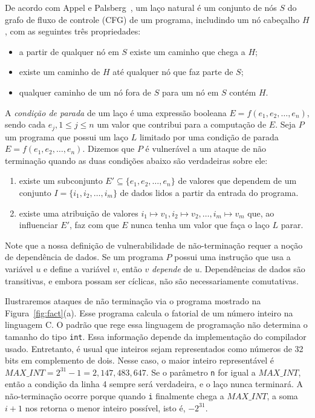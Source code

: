 \documentclass{llncs}
\begin{document}
De acordo com Appel e Palsberg~\cite[p.376]{Appel02}, um laço natural é um
conjunto de nós $S$ do grafo de fluxo de controle (CFG) de um programa,
includindo um nó cabeçalho $H$, com as seguintes três propriedades:
%
\begin{itemize}
\item a partir de qualquer nó em $S$ existe um caminho que chega a $H$;
\item existe um caminho de $H$ até qualquer nó que faz parte de $S$;
\item qualquer caminho de um nó fora de $S$ para um nó em $S$
contém $H$.
\end{itemize}
%
A {\em condição de parada} de um laço é uma expressão booleana
$E = f(e_1, e_2, \ldots, e_n)$, sendo cada $e_j, 1 \leq j \leq n$ um valor que
contribui para a computação de $E$.
Seja $P$ um programa que possui um laço $L$ limitado por uma condição
de parada $E = f(e_1, e_2, \ldots, e_n)$.
Dizemos que $P$ é vulnerável a um ataque de não
terminação quando as duas condições abaixo são verdadeiras sobre ele:
\begin{enumerate}
\item existe um subconjunto $E' \subseteq \{e_1, e_2, \ldots, e_n\}$ de
valores que dependem de um conjunto $I = \{i_1, i_2, \ldots, i_m\}$ de
dados lidos a partir da entrada do programa.
\item existe uma atribuição de valores $i_1 \mapsto v_1,
i_2 \mapsto v_2, \ldots, i_m \mapsto v_m$ que, ao influenciar $E'$, faz com
que $E$ nunca tenha um valor que faça o laço $L$ parar.
\end{enumerate}
Note que a nossa definição de vulnerabilidade de não-terminação requer a
noção de dependência de dados.
Se um programa $P$ possui uma instrução que usa a variável $u$ e define a
variável $v$, então $v$ {\em depende} de $u$.
Dependências de dados são transitivas, e embora possam ser cíclicas, não
são necessariamente comutativas.

Ilustraremos ataques de não terminação via o programa mostrado na
Figura~\ref{fig:fact}(a).
Esse programa calcula o fatorial de um número inteiro na linguagem C.
O padrão que rege essa linguagem de programação não determina o tamanho do
tipo \texttt{int}.
Essa informação depende da implementação do compilador usado.
Entretanto, é usual que inteiros sejam representados como números de 32
bits em complemento de dois. 
Nesse caso, o maior inteiro representável é
$\mathit{MAX\_INT} = 2^{31} - 1 = 2,147,483,647$.
Se o parâmetro \texttt{n} for igual a $\mathit{MAX\_INT}$, então a condição
da linha 4 sempre será verdadeira, e o laço nunca terminará.
A não-terminação ocorre porque quando \texttt{i} finalmente chega a
$\mathit{MAX\_INT}$, a soma $i + 1$ nos retorna o menor inteiro possível, isto
é, $- 2^{31}$.
\end{document}
